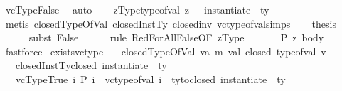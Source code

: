 \begin{isabellebody}
\ vcTypeFalse\ \isamarkupfalse%
\ auto\isanewline
\ \ \isamarkupfalse%
\ zType{\isacharcolon}{\kern0pt}{\isachardoublequoteopen}type{\isacharunderscore}{\kern0pt}of{\isacharunderscore}{\kern0pt}val\ z\ \ {\isacharequal}{\kern0pt}\ instantiate\ {\isasymOmega}\ ty{\isachardoublequoteclose}\ \isamarkupfalse%
\ {\isacharparenleft}{\kern0pt}metis\ closedTypeOfVal\ closedInstTy\ closed{\isacharunderscore}{\kern0pt}inv{}\ vc{\isacharunderscore}{\kern0pt}type{\isacharunderscore}{\kern0pt}of{\isacharunderscore}{\kern0pt}val{\isachardot}{\kern0pt}simps{\isacharparenright}{\kern0pt}\isanewline
\ \ \isamarkupfalse%
\ {\isacharquery}{\kern0pt}thesis\isanewline
\ \ \ \ \isamarkupfalse%
\ {\isacharparenleft}{\kern0pt}subst\ False{\isacharparenright}{\kern0pt}\isanewline
\ \ \ \ \isamarkupfalse%
\ {\isacharparenleft}{\kern0pt}rule\ RedForAllFalse{\isacharbrackleft}{\kern0pt}OF\ zType{\isacharbrackright}{\kern0pt}{\isacharparenright}{\kern0pt}\isanewline
\ \ \ \ \isamarkupfalse%
\ {\isacartoucheopen}{\isasymnot}\ P\ z{\isacartoucheclose}\ body\ \isamarkupfalse%
\ fastforce\isanewline
{}\isamarkupfalse%
%
\endisatagproof
{\isafoldproof}%
%
\isadelimproof
\isanewline
%
\endisadelimproof
\isanewline
{}\isamarkupfalse%
\ exists{\isacharunderscore}{\kern0pt}vc{\isacharunderscore}{\kern0pt}type{\isacharcolon}{\kern0pt}\isanewline
\ \ \ closedTypeOfVal{\isacharcolon}{\kern0pt}{\isachardoublequoteopen}{\isasymAnd}\ v{\isacharcolon}{\kern0pt}{\isacharcolon}{\kern0pt}{\isacharparenleft}{\kern0pt}{\isacharprime}{\kern0pt}a{\isacharcomma}{\kern0pt}\ {\isacharprime}{\kern0pt}m{\isacharparenright}{\kern0pt}\ val{\isachardot}{\kern0pt}\ closed\ {\isacharparenleft}{\kern0pt}type{\isacharunderscore}{\kern0pt}of{\isacharunderscore}{\kern0pt}val\ v{\isacharparenright}{\kern0pt}{\isachardoublequoteclose}\ \isanewline
\ \ \ closedInstTy{\isacharcolon}{\kern0pt}{\isachardoublequoteopen}closed\ {\isacharparenleft}{\kern0pt}instantiate\ {\isasymOmega}\ ty{\isacharparenright}{\kern0pt}{\isachardoublequoteclose}\ \isanewline
\ \ \ vcTypeTrue{\isacharcolon}{\kern0pt}{\isachardoublequoteopen}{\isasymAnd}\ i{\isachardot}{\kern0pt}\ {\isacharparenleft}{\kern0pt}P\ i{\isacharparenright}{\kern0pt}\ {\isasymLongrightarrow}\ vc{\isacharunderscore}{\kern0pt}type{\isacharunderscore}{\kern0pt}of{\isacharunderscore}{\kern0pt}val\ i\ {\isacharequal}{\kern0pt}\ ty{\isacharunderscore}{\kern0pt}to{\isacharunderscore}{\kern0pt}closed\ {\isacharparenleft}{\kern0pt}instantiate\ {\isasymOmega}\ ty{\isacharparenright}{\kern0pt}{\isachardoublequoteclose}\ \isanewline

\end{isabellebody}
